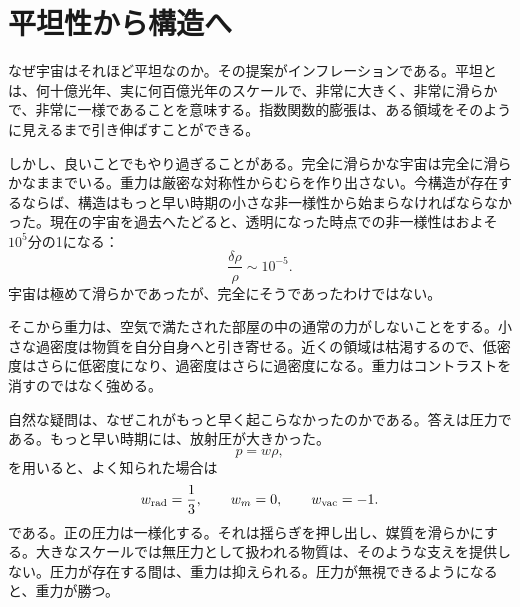 \begin{classroomqa}
\end{classroomqa}

\begin{classroomqa}
\end{classroomqa}

\section{平坦性から構造へ}

なぜ宇宙はそれほど平坦なのか。その提案がインフレーションである。平坦とは、何十億光年、実に何百億光年のスケールで、非常に大きく、非常に滑らかで、非常に一様であることを意味する。指数関数的膨張は、ある領域をそのように見えるまで引き伸ばすことができる。

しかし、良いことでもやり過ぎることがある。完全に滑らかな宇宙は完全に滑らかなままでいる。重力は厳密な対称性からむらを作り出さない。今構造が存在するならば、構造はもっと早い時期の小さな非一様性から始まらなければならなかった。現在の宇宙を過去へたどると、透明になった時点での非一様性はおよそ\(10^5\)分の1になる：
\begin{equation}
\frac{\delta\rho}{\rho}\sim 10^{-5}.
\end{equation}
宇宙は極めて滑らかであったが、完全にそうであったわけではない。

そこから重力は、空気で満たされた部屋の中の通常の力がしないことをする。小さな過密度は物質を自分自身へと引き寄せる。近くの領域は枯渇するので、低密度はさらに低密度になり、過密度はさらに過密度になる。重力はコントラストを消すのではなく強める。

自然な疑問は、なぜこれがもっと早く起こらなかったのかである。答えは圧力である。もっと早い時期には、放射圧が大きかった。
\begin{equation}
p=w\rho,
\end{equation}
を用いると、よく知られた場合は
\begin{equation}
w_{\rm rad}=\frac13,\qquad
w_m=0,\qquad
w_{\rm vac}=-1.
\end{equation}
である。正の圧力は一様化する。それは揺らぎを押し出し、媒質を滑らかにする。大きなスケールでは無圧力として扱われる物質は、そのような支えを提供しない。圧力が存在する間は、重力は抑えられる。圧力が無視できるようになると、重力が勝つ。

